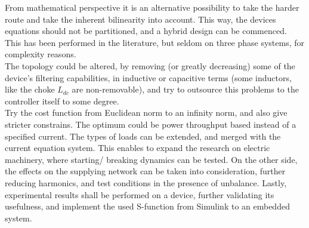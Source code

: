 		From mathematical perspective it is an alternative possibility to take the harder route and take the inherent bilinearity into account. This way, the devices equations should not be partitioned, and a hybrid design can be commenced. This has been performed in the literature, but seldom on three phase systems, for complexity reasons.\\ The topology could be altered, by removing (or greatly decreasing) some of the device's filtering  capabilities, in inductive or capacitive terms (some inductors, like the choke $L_{dc}$ are non-removable), and try to outsource this problems to the controller itself to some degree.\\
		Try the cost function from Euclidean norm to an infinity norm, and also give stricter constrains. The optimum could be power throughput based instead of a specified current. The types of loads can be extended, and merged with the current equation system. This enables to expand the research on electric machinery, where starting/ breaking dynamics can be tested. On the other side, the effects on the supplying network can be taken into consideration, further reducing harmonics, and test conditions in the presence of unbalance.
		Lastly, experimental results shall be performed on a device, further validating its usefulness, and implement the used S-function from Simulink to an embedded system.
